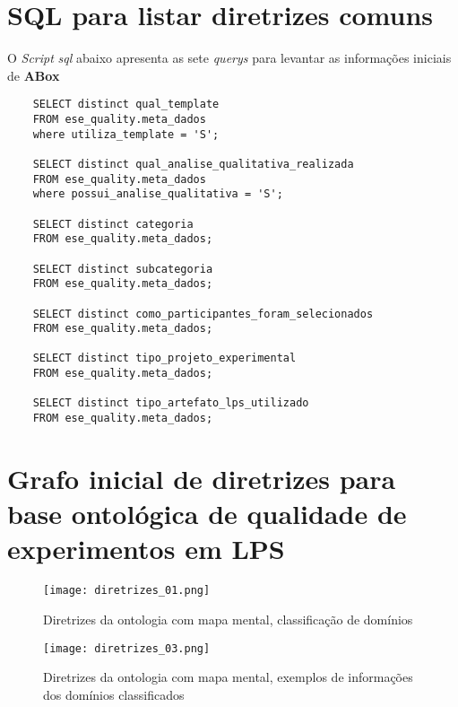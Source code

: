 \section{SQL para listar diretrizes comuns}
\label{apen:a2}

O \textit{Script} \textit{sql} abaixo apresenta as sete \textit{querys} para levantar as informações iniciais de \textbf{ABox}
\begin{scriptsize}
	\begin{verbatim}
	SELECT distinct qual_template
	FROM ese_quality.meta_dados
	where utiliza_template = 'S';
	
	SELECT distinct qual_analise_qualitativa_realizada
	FROM ese_quality.meta_dados
	where possui_analise_qualitativa = 'S';
	
	SELECT distinct categoria
	FROM ese_quality.meta_dados;
	
	SELECT distinct subcategoria
	FROM ese_quality.meta_dados;
	
	SELECT distinct como_participantes_foram_selecionados
	FROM ese_quality.meta_dados;
	
	SELECT distinct tipo_projeto_experimental
	FROM ese_quality.meta_dados;
	
	SELECT distinct tipo_artefato_lps_utilizado
	FROM ese_quality.meta_dados;
	\end{verbatim}
\end{scriptsize}


\section{Grafo inicial de diretrizes para base ontológica de qualidade de experimentos em LPS}
\label{apen:a3}

\begin{figure}[h]
	\centering					
	{\texttt{[image: diretrizes\_01.png]}}
	
	\caption{Diretrizes da ontologia com mapa mental, classificação de domínios}
	\label{fig:diretrizes-01}
\end{figure}

\begin{figure}[h]
	\centering					
	{\texttt{[image: diretrizes\_03.png]}}
	
	\caption{Diretrizes da ontologia com mapa mental, exemplos de informações dos domínios classificados}
	\label{fig:diretrizes-03}
\end{figure}











